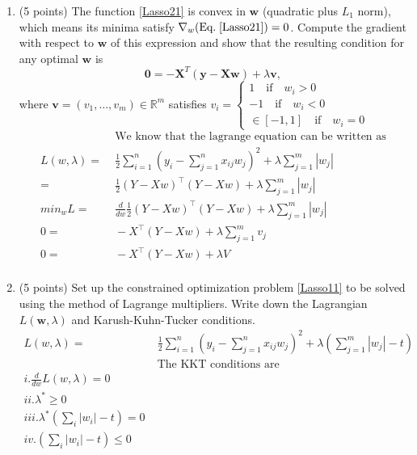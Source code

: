 \documentclass[english]{article}
\begin{document}
\begin{enumerate}
\item (5 points) The function \ref{Lasso21} is convex in $\mathbf{w}$ (quadratic plus $L_1$ norm), which means its minima satisfy $\nabla_w (\text{Eq.} \; \ref{Lasso21})=0$. Compute the gradient with respect to $\mathbf{w}$ of this expression and show that the resulting condition for any optimal $\mathbf{w}$ is
\begin{equation}\label{normalish}
\displaystyle \mathbf{0} = -\mathbf{X}^T(\mathbf{y}-\mathbf{X}\mathbf{w}) + \lambda \mathbf{v},
\end{equation}
where $\mathbf{v}=(v_1,\dots,v_m)\in\mathbb{R}^m$ satisfies
$v_i = 
\begin{cases} 
1 \quad \text{if} \quad w_i > 0\\
-1 \quad \text{if} \quad w_i < 0\\
\in[-1,1] \quad \text{if} \quad w_i = 0
\end{cases}$\\

\begin{align*}
	&\; \text{We know that the lagrange equation can be written as}\\
	L(w,\lambda) =&\; \frac{1}{2} \sum\limits_{i=1}^n \left( y_i - \sum_{j=1}^n x_{ij} w_j \right) ^2 + \lambda \sum_{j=1}^m |w_j| \\
	=&\; \frac{1}{2} (Y - Xw)^\top (Y - Xw) + \lambda \sum\limits_{j=1}^m |w_j| \\
	min_w L =&\; \frac{d}{dw} \frac{1}{2} (Y - Xw)^\top (Y - Xw) + \lambda \sum\limits_{j=1}^m |w_j| \\
	0 = &\; -X^\top (Y - Xw) + \lambda \sum\limits_{j=1}^m v_j \\
	0 = &\;  -X^\top (Y - Xw) + \lambda V \\
\end{align*}

\item (5 points) Set up the constrained optimization problem \ref{Lasso11} to be solved using the method of Lagrange multipliers. Write down the Lagrangian $L(\mathbf{w},\lambda)$ and Karush-Kuhn-Tucker conditions.\\
\begin{align*}
		L(w,\lambda) =&\; \frac{1}{2} \sum\limits_{i=1}^n \left( y_i - \sum_{j=1}^n x_{ij} w_j \right) ^2 + \lambda (\sum_{j=1}^m |w_j| -t) \\
		&\; \text{The KKT conditions are} \\
		i. \frac{d}{dw} L(w,\lambda) = 0\\
		ii. \lambda^* \ge 0 \\
		iii. \lambda^* (\sum_i |w_i| -t) = 0 \\
		iv. (\sum_i |w_i| -t) \le 0\\
\end{align*}


\end{enumerate}
\end{document}
